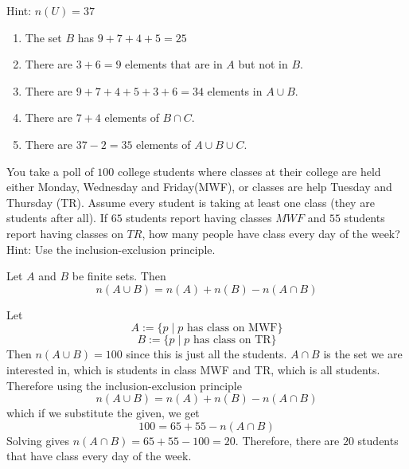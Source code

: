 \documentclass[addpoints,12pt]{exam}
\begin{document}
\begin{questions}
\begin{enumerate}[label = \alph*)]
			Hint: $n(U) = 37$
\end{enumerate}

\begin{center}
\end{center}

\begin{solution}
    \begin{enumerate}[label = \alph*)]
			\item The set $B$ has $9+7+4+5 = 25$
			\item There are $3+6=9$ elements that are in $A$ but not in $B$. 
			\item There are $9+7+4+5+3+6 = 34$  elements in $A\cup B$. 
			\item There are $7+4$ elements of $B\cap C$. 
			\item There are $37-2=35$ elements of $A\cup B\cup C$. 
    \end{enumerate}
\end{solution}

\newpage
\question You take a poll of $100$ college students where classes at their college are held either Monday, Wednesday and Friday(MWF), or classes are help Tuesday and Thursday (TR). Assume every student is taking at least one class (they are students after all). If $65$ students report having classes $MWF$ and $55$ students report having classes on $TR$, how many people have class every day of the week? Hint: Use the inclusion-exclusion principle. 


\begin{theorem}
    Let $A$ and $B$ be finite sets. Then 
		\[
		n(A\cup B) = n(A)+n(B)-n(A\cap B)
		\]
\end{theorem}

\begin{solution}
	Let 
	\[
	A := \{p\mid p \text{ has class on MWF}\}
	\]
	\[
	B := \{p\mid p \text{ has class on TR}\}
	\]
	Then $n(A\cup B) = 100$ since this is just all the students. $A\cap B$ is the set we are interested in, which is students in class MWF and TR, which is all students. Therefore using the inclusion-exclusion principle
	\[
	n(A\cup B) = n(A)+n(B)-n(A\cap B)
	\]
	which if we substitute the given, we get 
	\[
	100 = 65+55 - n(A\cap B)
	\]
	Solving gives $n(A\cap B) = 65+55-100=20$. Therefore, there are $20$ students that have class every day of the week. 
    

\end{solution}
\end{questions}
\end{document}
